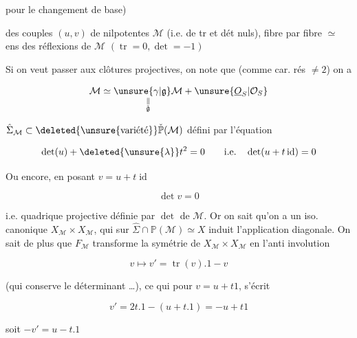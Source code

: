 
pour le changement de base)

 des couples $(u,v)$ de    nilpotentes $\mathcal M$  (i.e. de tr et dét nuls),  fibre par fibre $\simeq$ ens des réflexions de $\mathcal M$ $(\operatorname{tr}=0,\det=-1)$


Si on veut passer aux clôtures projectives, on note que (comme car. rés $\ne2$) on a

\[
\mathcal M\simeq\underset{\substack{\Vert\\\tilde{\mathfrak g}}}{\unsure{\gamma|\mathfrak g}\mathcal M}+\unsure{\underline O_S|\mathcal O_S}
\]

$\hat\Sigma_{\mathcal M}\subset\deleted{\unsure{\text{variété}}}\check{\mathbb P}(\mathcal M)$ défini par l'équation 

\[
\det(u)+\deleted{\unsure{\lambda}}t^2=0\qquad\text{i.e.}\quad\det(u+t\operatorname{id})=0
\]

Ou encore, en posant $v=u+t\operatorname{id}$

\[
\det v=0
\]

i.e.  quadrique projective définie par $\det$ de $\mathcal M$. Or on sait qu'on a un iso. canonique  $X_{\mathcal M}\times X_{\mathcal M}$,  qui sur $\hat\Sigma\cap\mathbb P(\mathcal M)\simeq X$ induit l'application diagonale. On sait de plus que  $F_{\mathcal M}$ transforme la symétrie de $X_{\mathcal M}\times X_{\mathcal M}$ en  l'anti involution

\[
v\longmapsto v'=\operatorname{tr}(v).1-v
\]

(qui conserve le déterminant \ldots), ce qui pour $v=u+t1$,  s'écrit

\[
v'=2t.1-(u+t.1)=-u+t1
\]

soit $-v'=u-t.1$

